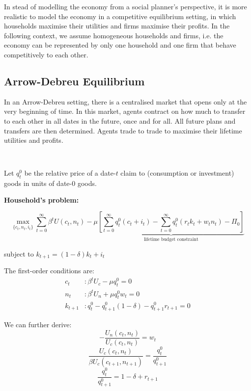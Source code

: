 \documentclass[10pt,a4]{article}
\begin{document}
{\label{984904}}

In stead of modelling the economy from a social planner's perspective,
it is more realistic to model the economy in a competitive equilibrium
setting, in which households maximise their utilities and firms maximise
their profits. In the following context, we assume homogeneous
households and firms, i.e. the economy can be represented by only one
household and one firm that behave competitively to each other.~

\subsection{Arrow-Debreu Equilibrium}

{\label{623891}}

In an Arrow-Debreu setting, there is a centralised market that opens
only at the very beginning of time. In this market, agents contract on
how much to transfer to each other in all dates in the future, once and
for all. All future plans and transfers are then determined. Agents
trade to trade to maximise their lifetime utilities and profits.~

~

Let $q_t^0$ be the relative price of a date-$t$ claim to (consumption or investment) goods in units of date-$0$ goods. 

\textbf{Household's problem:}

$$ \max_{\{c_t,n_t,i_t\}} \sum_{t=0}^{\infty}\beta^t U(c_t, n_t) - \mu\underbrace{\left[\sum_{t=0}^{\infty}q_t^0(c_t+i_t) - \sum_{t=0}^{\infty}q_t^0(r_tk_t + w_tn_t) - \Pi_0\right]}_{\textrm{lifetime budget constraint}} $$

\begin{center}subject to $k_{t+1} = (1-\delta)k_t + i_t$\end{center}



The first-order conditions are:
\[
    \begin{aligned}
        c_t &: \beta^t U_c - \mu q_t^0 = 0 \\
        n_t &: \beta^t U_n + \mu q_t^0 w_t = 0 \\
        k_{t+1} &: q_t^0 - q_{t+1}^0 (1-\delta) - q_{t+1}^0 r_{t+1} = 0
    \end{aligned}
\]

We can further derive:
$$ -\frac{U_n(c_t, n_t)}{U_c(c_t, n_t)} = w_t $$
$$ \frac{U_c(c_t, n_t)}{\beta U_c(c_{t+1}, n_{t+1})} = \frac{q_t^0}{q_{t+1}^0} $$
$$ \frac{q_t^0}{q_{t+1}^0} = 1-\delta + r_{t+1} $$
\end{document}
